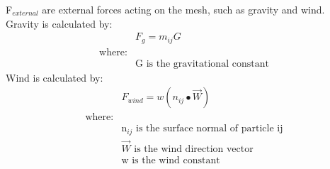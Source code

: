 F$_{external}$ are external forces acting on the mesh, such as gravity and wind.
\\Gravity is calculated by:
\begin{equation}
\begin{split}
\label{eq:gravity}
  &F_{g} = m_{ij}G
  \\\text{where:}
  \\&\text{G is the gravitational constant}
\end{split}
\end{equation}
Wind is calculated by:
\begin{equation}
\begin{split}
\label{eq:wind}
  &F_{wind} = w(n_{ij}\bullet\overrightarrow{W})
  \\\text{where:}
  \\&\text{n$_{ij}$ is the surface normal of particle ij}
  \\&\text{$\overrightarrow{W}$ is the wind direction vector}
  \\&\text{w is the wind constant}
\end{split}
\end{equation}

